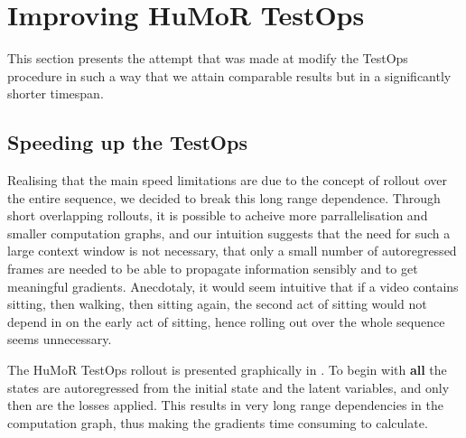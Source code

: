 \section{Improving HuMoR TestOps}
\label{sec:humor_improvement}

This section presents the attempt that was made at modify the TestOps procedure in such a way that we attain comparable results but in a significantly shorter timespan.

\subsection{Speeding up the TestOps}

Realising that the main speed limitations are due to the concept of rollout over the entire sequence, we decided to break this long range dependence. Through short overlapping rollouts, it is possible to acheive more parrallelisation and smaller computation graphs, and our intuition suggests that the need for such a large context window is not necessary, that only a small number of autoregressed frames are needed to be able to propagate information sensibly and to get meaningful gradients. Anecdotaly, it would seem intuitive that if a video contains sitting, then walking, then sitting again, the second act of sitting would not depend in on the early act of sitting, hence rolling out over the whole sequence seems unnecessary.

The HuMoR TestOps rollout is presented graphically in . To begin with \textbf{all} the states are autoregressed from the initial state and the latent variables, and only then are the losses applied. This results in very long range dependencies in the computation graph, thus making the gradients time consuming to calculate. 

